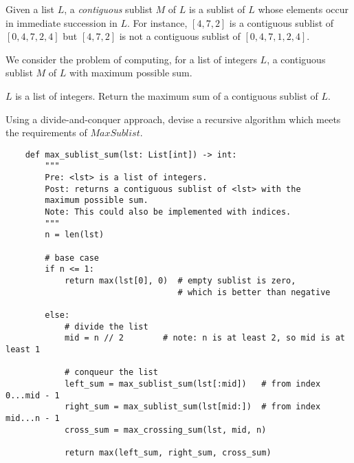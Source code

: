 
Given a list $L$, a \textit{contiguous}
sublist $M$ of $L$ is a sublist of $L$
whose elements occur in immediate succession in $L$.
For instance, $[4,7,2]$ is a contiguous sublist of $[0,4,7,2,4]$
but $[4,7,2]$ is not a contiguous sublist of $[0,4,7,1,2,4]$.

We consider the problem of computing,
for a list of integers $L$,
a contiguous sublist $M$ of $L$
with maximum possible sum.

\begin{minipage}{\linewidth}
    \begin{algorithm}[H]
        \caption{$MaxSublist(L)$}
        \begin{algorithmic}[1]

            \vspace{.5 em}
            \Require $L$ is a list of integers.
            \Ensure Return the maximum sum of a contiguous sublist of $L$.
            \vspace{.5 em}

        \end{algorithmic}
    \end{algorithm}
\end{minipage}

    Using a divide-and-conquer approach, devise a recursive algorithm 
    which meets the requirements of $MaxSublist$.
    
    \begin{verbatim}
    def max_sublist_sum(lst: List[int]) -> int:
        """
        Pre: <lst> is a list of integers.
        Post: returns a contiguous sublist of <lst> with the 
        maximum possible sum.
        Note: This could also be implemented with indices.
        """
        n = len(lst)

        # base case
        if n <= 1:
            return max(lst[0], 0)  # empty sublist is zero, 
                                   # which is better than negative

        else:
            # divide the list
            mid = n // 2        # note: n is at least 2, so mid is at least 1
    
            # conqueur the list
            left_sum = max_sublist_sum(lst[:mid])   # from index 0...mid - 1
            right_sum = max_sublist_sum(lst[mid:])  # from index mid...n - 1
            cross_sum = max_crossing_sum(lst, mid, n)
    
            return max(left_sum, right_sum, cross_sum)
    \end{verbatim}
    
